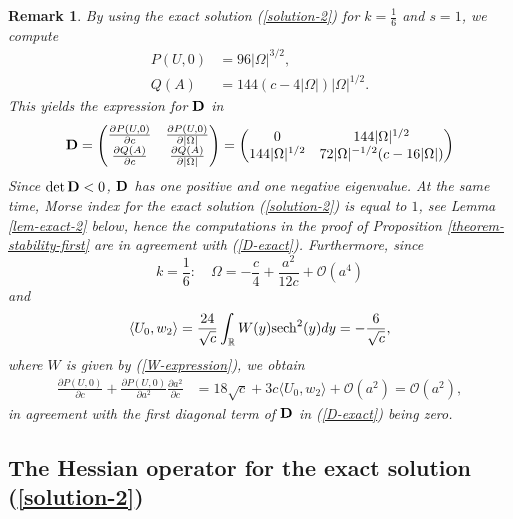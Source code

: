 \documentclass[12pt,reqno]{amsart}
\numberwithin{equation}{section}
\newtheorem{remark}{Remark}
\begin{document}
\begin{remark}
By using the exact solution (\ref{solution-2}) for $k = \frac{1}{6}$ and $s = 1$, we compute 
\begin{align*} 
P(U,0) &= 96 |\Omega|^{3/2}, \\ 
Q(A) &= 144(c - 4|\Omega|) |\Omega|^{1/2}.
\end{align*}
This yields the expression for ${\bf D}$ in 
\begin{align}
\label{D-exact}
{\bf D} = 
\begin{pmatrix}
    \frac{\partial P(U,0)}{\partial c} & \frac{\partial P(U,0)}{\partial |\Omega|} \\
    \frac{\partial Q(A)}{\partial c} & \frac{\partial Q(A)}{\partial |\Omega|}   
\end{pmatrix}
= \begin{pmatrix}
    0 & 144 |\Omega|^{1/2} \\
    144 |\Omega|^{1/2} & 72 |\Omega|^{-1/2} (c - 16 |\Omega|)  
\end{pmatrix}
\end{align}
Since $\det {\bf D} < 0$, ${\bf D}$ has one positive and one negative eigenvalue. At the same time, Morse index for the exact solution (\ref{solution-2}) is equal to $1$, see Lemma \ref{lem-exact-2} below, hence the computations in the proof of Proposition \ref{theorem-stability-first} are in agreement with (\ref{D-exact}). Furthermore, since 
$$
k = \frac{1}{6} : \quad \Omega = -\frac{c}{4} + \frac{a^2}{12 c} + \mathcal{O}(a^4)
$$
and 
$$
\langle U_0, w_2 \rangle = \frac{24}{\sqrt{c}} \int_{\mathbb{R}} W(y) {\rm sech}^2(y) dy = -\frac{6}{\sqrt{c}},
$$
where $W$ is given by (\ref{W-expression}), we obtain 
\begin{align*}
\frac{\partial P(U,0)}{\partial c} + \frac{\partial P(U,0)}{\partial a^2} \frac{\partial a^2}{\partial c} &= 
18 \sqrt{c} + 3 c \langle U_0, w_2 \rangle + \mathcal{O}(a^2) = \mathcal{O}(a^2),
\end{align*}
in agreement with the first diagonal term of ${\bf D}$ in (\ref{D-exact}) being zero.
\label{remark-exact-2}
\end{remark}



\subsection{The Hessian operator for the exact solution (\ref{solution-2})}
\end{document}
